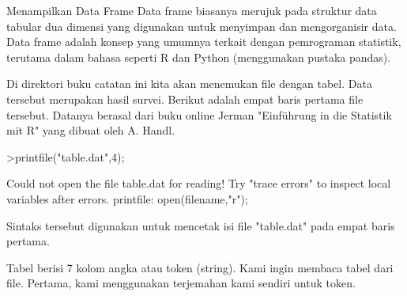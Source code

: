 \documentclass[a4paper,10pt]{article}
\begin{document}
\begin{eulernotebook}
\begin{eulercomment}
\begin{eulercomment}
\begin{eulercomment}
\begin{eulercomment}
\begin{eulercomment}
\begin{eulercomment}
\begin{eulercomment}
\begin{eulercomment}
\begin{eulercomment}
\begin{eulercomment}
\begin{eulercomment}
\begin{eulercomment}
\begin{eulercomment}
\begin{eulercomment}
\begin{eulercomment}
\begin{eulercomment}
\begin{eulercomment}
\begin{eulercomment}
\begin{eulercomment}
\end{eulercomment}
\eulersubheading{}
\begin{eulercomment}
Menampilkan Data Frame 
Data frame biasanya merujuk pada struktur data tabular dua dimensi
yang digunakan untuk menyimpan dan mengorganisir data. Data frame
adalah konsep yang umumnya terkait dengan pemrograman statistik,
terutama dalam bahasa seperti R dan Python (menggunakan pustaka
pandas).

Di direktori buku catatan ini kita akan menemukan file dengan tabel.
Data tersebut merupakan hasil survei. Berikut adalah empat baris
pertama file tersebut. Datanya berasal dari buku online Jerman
"Einführung in die Statistik mit R" yang dibuat oleh A. Handl.
\end{eulercomment}
\begin{eulerprompt}
>printfile("table.dat",4);
\end{eulerprompt}
\begin{euleroutput}
  Could not open the file
  table.dat
  for reading!
  Try "trace errors" to inspect local variables after errors.
  printfile:
      open(filename,"r");
\end{euleroutput}
\begin{eulercomment}
Sintaks tersebut digunakan untuk mencetak isi file "table.dat" pada
empat baris pertama.

Tabel berisi 7 kolom angka atau token (string). Kami ingin membaca
tabel dari file. Pertama, kami menggunakan terjemahan kami sendiri
untuk token.


\end{eulercomment}
\end{eulercomment}
\end{eulercomment}
\end{eulercomment}
\end{eulercomment}
\end{eulercomment}
\end{eulercomment}
\end{eulercomment}
\end{eulercomment}
\end{eulercomment}
\end{eulercomment}
\end{eulercomment}
\end{eulercomment}
\end{eulercomment}
\end{eulercomment}
\end{eulercomment}
\end{eulercomment}
\end{eulercomment}
\end{eulercomment}
\end{eulernotebook}
\end{document}
